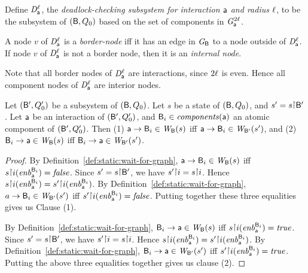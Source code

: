 \begin{definition} \label{def:dsk}
Define $\mathit{D}_{\mathsf{a}}^{\ell}$, the \emph{deadlock-checking subsystem for interaction $\mathsf{a}$ and
radius $\ell$}, to be the subsystem of $(\mathsf{B}, Q_0)$ based on the set of %
components in $\mathit{G}_{\mathsf{a}}^{2\ell}$.  %
\end{definition}

\begin{definition}  \label{def:dsk.border-and internal}
A node $v$ of $\mathit{D}_{\mathsf{a}}^{\ell}$ is a \emph{border-node} iff it has an
edge in $\mathit{G}_{\mathsf{B}}$ to a node outside of $\mathit{D}_{\mathsf{a}}^{\ell}$.
If node $v$ of $\mathit{D}_{\mathsf{a}}^{\ell}$ is not a border node, then it is an \emph{internal node}.
\end{definition}
Note that all border nodes of  $\mathit{D}_{\mathsf{a}}^{\ell}$ are interactions,
since $2\ell$ is even. Hence all component nodes of $\mathit{D}_{\mathsf{a}}^{\ell}$ are
interior nodes.


\begin{proposition} \label{prop:edge-projection}
Let $(\mathsf{B}', Q'_0)$ be a subsystem of
$(\mathsf{B}, Q_0)$. Let $s$ be a state of $(\mathsf{B}, Q_0)$, and $s' = s \pj \B'$.
Let $\mathsf{a}$ be an interaction of $(\mathsf{B}', Q'_0)$, and $\mathsf{B}_i \in \mathit{components}(\mathsf{a})$ an atomic component of $(\mathsf{B}', Q'_0)$.
Then 
(1) $\mathsf{a} \rightarrow \mathsf{B}_i \in \mathit{W}_{\mathsf{B}}({s})$ iff $\mathsf{a} \rightarrow \mathsf{B}_i \in \mathit{W}_{\mathsf{B}'}({s'})$, and
(2) $\mathsf{B}_i \rightarrow \mathsf{a} \in \mathit{W}_{\mathsf{B}}({s})$ iff $\mathsf{B}_i \rightarrow \mathsf{a} \in \mathit{W}_{\mathsf{B}'}({s'})$.
\end{proposition}
%
\begin{proof}
By Definition~\ref{def:static:wait-for-graph}, $\mathsf{a} \rightarrow \mathsf{B}_i \in \mathit{W}_{\mathsf{B}}({s})$ iff $s \pj i (\gd{\act}{\B_i}) = \false$.
Since $s' = s \pj \B'$, we have $s' \pj i = s \pj i$. Hence
$s \pj i (\gd{\act}{\B_i}) = s' \pj i (\gd{\act}{\B_i})$.
By Definition~\ref{def:static:wait-for-graph}, 
$a \rightarrow \mathsf{B}_i \in \mathit{W}_{\mathsf{B}'}({s'})$ iff $s' \pj i (\gd{\act}{\B_i}) = \false$.
Putting together these three equalities gives us Clause (1).

By Definition~\ref{def:static:wait-for-graph},
$\mathsf{B}_i \rightarrow \mathsf{a} \in \mathit{W}_{\mathsf{B}}({s})$ iff 
$s \pj i (\gd{\act}{\B_i}) = \true$.
Since $s' = s \pj \B'$, we have $s' \pj i = s \pj i$. Hence
$s \pj i (\gd{\act}{\B_i}) = s' \pj i (\gd{\act}{\B_i})$.
By Definition~\ref{def:static:wait-for-graph},
$\mathsf{B}_i \rightarrow \mathsf{a} \in \mathit{W}_{\mathsf{B}'}({s'})$ iff $s' \pj i (\gd{\act}{\B_i}) = \true$.
Putting the above three equalities together gives us clause (2).
\end{proof}


